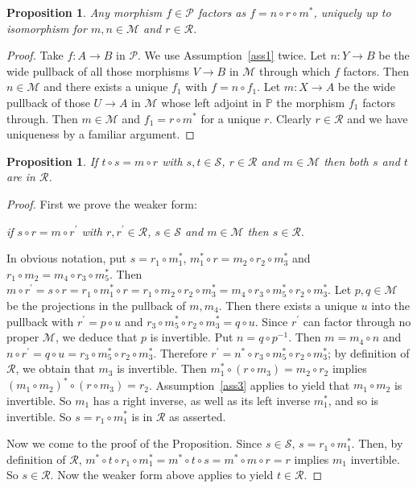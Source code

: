 \documentclass[a4paper,12pt,reqno]{amsart}
\newtheorem{proposition}[theorem]{Proposition}
\theoremstyle{definition}
\theoremstyle{fact}
\theoremstyle{genquest}
\theoremstyle{step}
\newcommand{\ra}{\rightarrow}
\def\CM{{\mathscr M}}
\def\CP{{\mathscr P}}
\def\CR{{\mathscr R}}
\def\CS{{\mathscr S}}
\begin{document}
\begin{proposition}\label{factorize}
Any morphism $f\in \CP$ factors as $f=n\circ r\circ m^*$, uniquely up to isomorphism
for $m,n\in \CM$ and $r\in \CR$. 
\end{proposition}
\begin{proof}
Take $f : A \ra B$ in $\CP$. We use Assumption~\ref{ass1} twice.
Let $n:Y\ra B$ be the wide pullback of all those morphisms 
$V\ra B$ in $\CM$ through which $f$ factors.
Then $n\in \CM$ and there exists a unique $f_1$ with $f = n\circ f_1$.
Let $m:X\ra A$ be the wide pullback of those $U\ra A$ in $\CM$ 
whose left adjoint in $\mathbb{P}$ the morphism $f_1$ factors through.
Then $m\in \CM$ and $f_1 = r \circ m^*$ for a unique $r$.
Clearly $r\in \CR$ and we have uniqueness by a familiar argument. 
\end{proof}

\begin{proposition}\label{oldeff}
If $t\circ s = m\circ r$ with $s,t\in \CS$, $r\in \CR$ and $m\in \CM$ then both $s$ and
$t$ are in $\CR$. 
\end{proposition}
\begin{proof}
First we prove the weaker form: 

{\em if $s\circ r = m\circ r^{\prime}$ with $r,r^{\prime} \in \CR$, $s\in \CS$ and $m\in \CM$ then $s\in \CR$}.

\noindent In obvious notation, put $s=r_1\circ m_1^*$, $m_1^*\circ r = m_2\circ r_2\circ m_3^*$
and $r_1\circ m_2=m_4\circ r_3\circ m_5^*$.
Then $m\circ r^{\prime} = s\circ r = r_1\circ m_1^*\circ r = r_1\circ m_2\circ r_2 \circ m_3^* = m_4\circ r_3\circ m_5^*\circ r_2 \circ m_3^*$. 
Let $p,q\in \CM$ be the projections in the pullback of $m,m_4$. 
Then there exists a unique $u$ into the pullback with $r^{\prime} = p\circ u$
and $r_3\circ m_5^*\circ r_2 \circ m_3^* = q\circ u$. 
Since $r^{\prime}$ can factor through no proper $\CM$, we deduce that $p$ is invertible.
Put $n = q\circ p^{-1}$.
Then $m=m_4\circ n$ and $n\circ r^{\prime} = q\circ u = r_3\circ m_5^*\circ r_2 \circ m_3^*$. Therefore $r^{\prime} = n^* \circ r_3\circ m_5^*\circ r_2 \circ m_3^*$;
by definition of $\CR$, we obtain that $m_3$ is invertible. 
Then $m_1^*\circ (r\circ m_3) = m_2 \circ r_2$ implies 
$(m_1\circ m_2)^*\circ (r\circ m_3) = r_2$. Assumption~\ref{ass3} applies to yield that
$m_1\circ m_2$ is invertible. So $m_1$ has a right inverse, as well as its left inverse
$m_1^*$, and so is invertible. So $s=r_1\circ m_1^*$ is in $\CR$ as asserted.  

Now we come to the proof of the Proposition. Since $s\in \CS$, $s= r_1\circ m_1^*$. 
Then, by definition of $\CR$, $m^*\circ t \circ r_1\circ m_1^* 
= m^*\circ t \circ s= m^*\circ m\circ r = r$ implies $m_1$
invertible. So $s\in \CR$. Now the weaker form above applies to yield $t\in \CR$.  
\end{proof}
\end{document}
